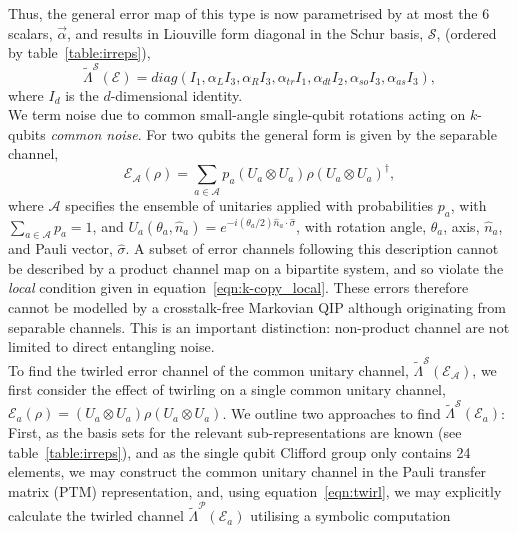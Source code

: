 Thus, the general error map of this type is now parametrised by at most the $6$ scalars, $\vec\alpha$, and results
in Liouville form diagonal in the Schur basis, $\mathcal{S}$, (ordered by table~\ref{table:irreps}),
\begin{equation}\label{eqn:Liouville}
    \tilde\Lambda^\mathcal{S}(\mathcal{E}) = diag\left(I_1, \alpha_{L} I_3, \alpha_{R} I_3, \alpha_{tr} I_1, \alpha_{dt} I_2, \alpha_{so} I_3, \alpha_{as} I_3\right),
\end{equation}
where $I_d$ is the $d$-dimensional identity.\\
We term noise due to common small-angle single-qubit rotations acting on $k$-qubits \emph{common noise}. For two qubits the general form is given by the separable channel,
\begin{equation}\label{eqn:rotation_channel}
    \mathcal{E}_\mathcal{A}(\rho)=\sum_{a\in \mathcal{A}} p_a(U_a\otimes U_a)\rho(U_a\otimes U_a)^\dagger,
\end{equation}
where $\mathcal{A}$ specifies the ensemble of unitaries applied with probabilities $p_a$, with $\sum_{a \in\mathcal{A}}p_a=1$, and $U_a(\theta_a,\hat{n}_a)=e^{-i(\theta_a/2)\hat n_a\cdot\hat\sigma}$, with rotation angle, $\theta_a$, axis, $\hat n_a$, and Pauli vector, $\hat\sigma$.
A subset of error channels following this description cannot be described by a product channel map on a bipartite system, and so violate the \emph{local} condition given in equation~\ref{eqn:k-copy_local}. These errors therefore cannot be modelled by a crosstalk-free Markovian QIP although originating from separable channels.
This is an important distinction: non-product channel are not limited to direct entangling noise.\\
To find the twirled error channel of the common unitary channel, $\tilde\Lambda^\mathcal{S}(\mathcal{E}_\mathcal{A})$, we first consider the effect of twirling on a single common unitary channel, $\mathcal{E}_a(\rho) = (U_a\otimes U_a)\rho(U_a\otimes U_a)$. We outline two approaches to find $\tilde\Lambda^\mathcal{S}(\mathcal{E}_a)$:\\ 
First, as the basis sets for the relevant
sub-representations are known (see table~\ref{table:irreps}), and as the single qubit
Clifford group only contains 24 elements, we may construct the common unitary
channel in the Pauli transfer matrix (PTM) representation\cite{hashim_practical_2025,gilchrist_vectorization_2009},  and, using equation~\ref{eqn:twirl}, we may explicitly calculate the twirled channel
$\tilde\Lambda^\mathcal{P}(\mathcal{E}_a)$ utilising a symbolic computation
